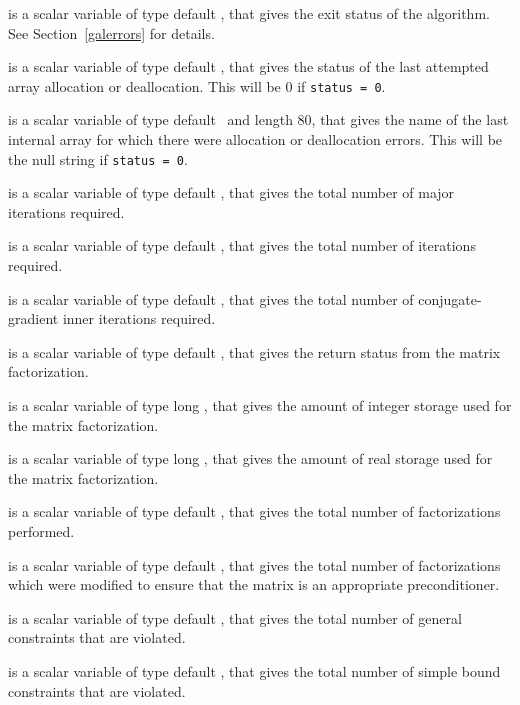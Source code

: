 \begin{description}

 is a scalar variable of type default \integer, that gives the
exit status of the algorithm. 
See Section~\ref{galerrors}
for details.

 is a scalar variable of type default \integer, that gives
the status of the last attempted array allocation or deallocation.
This will be 0 if {\tt status = 0}.

 is a scalar variable of type default \character\
and length 80, that  gives the name of the last internal array 
for which there were allocation or deallocation errors.
This will be the null string if {\tt status = 0}. 

 is a scalar variable of type default \integer, that gives the
total number of major iterations required.

 is a scalar variable of type default \integer, that gives the
total number of iterations required.

 is a scalar variable of type default \integer, that gives the
total number of conjugate-gradient inner iterations required.

 is a scalar variable of type default \integer, that 
gives the return status from the matrix factorization.

 is a scalar variable of type long
\integer, that gives the amount of integer storage used for the matrix 
factorization.

 is a scalar variable of type long \integer, 
that gives the amount of real storage used for the matrix factorization.

 is a scalar variable of type default \integer, that gives the
total number of factorizations performed.

 is a scalar variable of type default \integer, that gives the
total number of factorizations which were modified to 
ensure that the matrix is an appropriate preconditioner. 

 is a scalar variable of type default \integer, that 
gives the total number of general constraints that are violated.

 is a scalar variable of type default \integer, that 
gives the total number of simple bound constraints that are violated.


\end{description}
